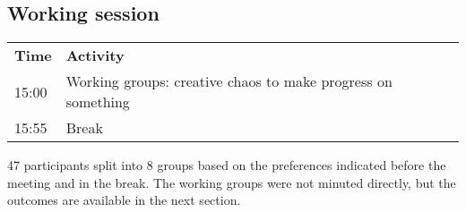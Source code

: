 \subsection{Working session}

\begin{table}[!h]
    \centering
    \begin{tabular}{@{}
        |p{}
        |p{}
        |@{}}
    \rowcolor{Task32Blue2} \textbf{Time} & \textbf{Activity} \\    
    15:00 & Working groups: creative chaos to make progress on something \\
    15:55 & Break
    \end{tabular}
    \label{tab:day2-workingsession-agenda}
\end{table}

47 participants split into 8 groups based on the preferences indicated before the meeting and in the break. The working groups were not minuted directly, but the outcomes are available in the next section.
